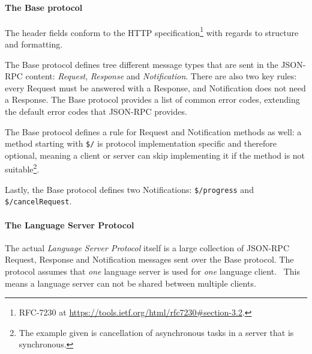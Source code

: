 \paragraph*{The Base protocol}
The header fields conform to the HTTP specification\footnote{RFC-7230 at \href{https://tools.ietf.org/html/rfc7230\#section-3.2}{https://tools.ietf.org/html/rfc7230\#section-3.2}.} with regards to structure and formatting.

The Base protocol defines tree different message types that are sent in the \gls{JSON-RPC} content: \emph{Request}, \emph{Response} and \emph{Notification}.
There are also two key rules: every Request must be answered with a Response, and Notification does not need a Response.
The Base protocol provides a list of common error codes, extending the default error codes that \gls{JSON-RPC} provides.~\cite{microsoftLanguageServerProtocol2020}

The Base protocol defines a rule for Request and Notification methods as well: a method starting with \texttt{\$/} is protocol implementation specific and therefore optional, meaning a client or server can skip implementing it if the method is not suitable\footnote{The example given is cancellation of asynchronous tasks in a server that is synchronous.}.~\cite{microsoftLanguageServerProtocol2020}

Lastly, the Base protocol defines two Notifications: \texttt{\$/progress} and \texttt{\$/cancelRequest}.~\cite{microsoftLanguageServerProtocol2020}

\paragraph*{The Language Server Protocol}
The actual \emph{Language Server Protocol} itself is a large collection of \gls{JSON-RPC} Request, Response and Notification messages sent over the Base protocol.
The protocol assumes that \textit{one} language server is used for \textit{one} language client.~\cite{microsoftLanguageServerProtocol2020}
This means a language server can not be shared between multiple clients.

